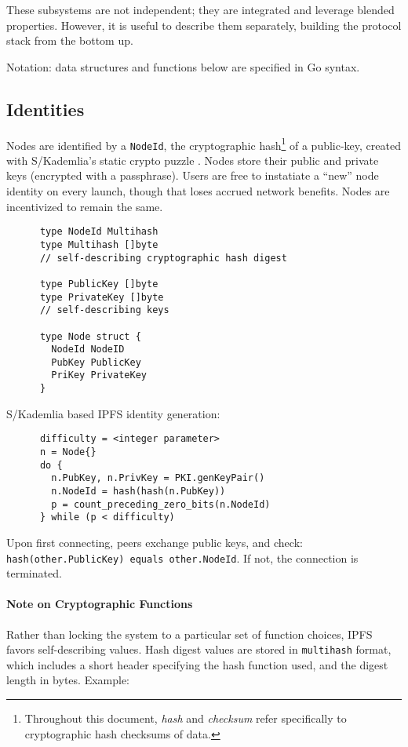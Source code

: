 \documentclass{sig-alternate}
\begin{document}
These subsystems are not independent; they are integrated and leverage
blended properties. However, it is useful to describe them separately,
building the protocol stack from the bottom up.

Notation: data structures and functions below are specified in Go syntax.

\subsection{Identities}

Nodes are identified by a \texttt{NodeId}, the cryptographic hash\footnote{Throughout this document, \textit{hash} and \textit{checksum} refer specifically to cryptographic hash checksums of data.} of a public-key, created with S/Kademlia's static crypto puzzle \cite{skademlia}. Nodes store their public and private keys (encrypted with a passphrase). Users are free to instatiate a ``new'' node identity on every launch, though that loses accrued network benefits. Nodes are incentivized to remain the same.

\begin{verbatim}
      type NodeId Multihash
      type Multihash []byte
      // self-describing cryptographic hash digest

      type PublicKey []byte
      type PrivateKey []byte
      // self-describing keys

      type Node struct {
        NodeId NodeID
        PubKey PublicKey
        PriKey PrivateKey
      }
\end{verbatim}

S/Kademlia based IPFS identity generation:

\begin{verbatim}
      difficulty = <integer parameter>
      n = Node{}
      do {
        n.PubKey, n.PrivKey = PKI.genKeyPair()
        n.NodeId = hash(hash(n.PubKey))
        p = count_preceding_zero_bits(n.NodeId)
      } while (p < difficulty)
\end{verbatim}


Upon first connecting, peers exchange public keys, and check: \texttt{hash(other.PublicKey) equals other.NodeId}. If not, the connection is terminated.

\paragraph{Note on Cryptographic Functions} Rather than locking the system to a particular set of function choices, IPFS favors self-describing values. Hash digest values are stored in \texttt{multihash} format, which includes a short header specifying the hash function used, and the digest length in bytes. Example:
\end{document}
